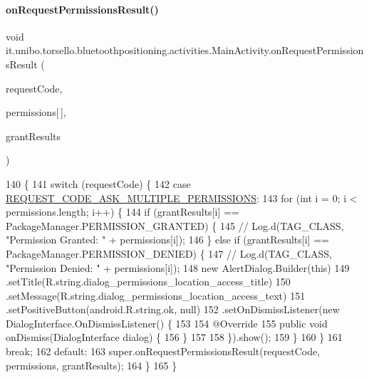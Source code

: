 \paragraph{\texorpdfstring{on\+Request\+Permissions\+Result()}{onRequestPermissionsResult()}}
{\footnotesize\ttfamily void it.\+unibo.\+torsello.\+bluetoothpositioning.\+activities.\+Main\+Activity.\+on\+Request\+Permissions\+Result (\begin{DoxyParamCaption}\item[{int}]{request\+Code,  }\item[{@Non\+Null String}]{permissions\mbox{[}$\,$\mbox{]},  }\item[{@Non\+Null int \mbox{[}$\,$\mbox{]}}]{grant\+Results }\end{DoxyParamCaption})}


\begin{DoxyCode}
140                                                                         \{
141         \textcolor{keywordflow}{switch} (requestCode) \{
142             \textcolor{keywordflow}{case} \hyperlink{classit_1_1unibo_1_1torsello_1_1bluetoothpositioning_1_1activities_1_1MainActivity_a319aed5cdd5724e043302babe5fcfeac_a319aed5cdd5724e043302babe5fcfeac}{REQUEST\_CODE\_ASK\_MULTIPLE\_PERMISSIONS}:
143                 \textcolor{keywordflow}{for} (\textcolor{keywordtype}{int} i = 0; i < permissions.length; i++) \{
144                     \textcolor{keywordflow}{if} (grantResults[i] == PackageManager.PERMISSION\_GRANTED) \{
145 \textcolor{comment}{//                        Log.d(TAG\_CLASS, "Permission Granted: " + permissions[i]);}
146                     \} \textcolor{keywordflow}{else} \textcolor{keywordflow}{if} (grantResults[i] == PackageManager.PERMISSION\_DENIED) \{
147 \textcolor{comment}{//                        Log.d(TAG\_CLASS, "Permission Denied: " + permissions[i]);}
148                         \textcolor{keyword}{new} AlertDialog.Builder(\textcolor{keyword}{this})
149                                 .setTitle(R.string.dialog\_permissions\_location\_access\_title)
150                                 .setMessage(R.string.dialog\_permissions\_location\_access\_text)
151                                 .setPositiveButton(android.R.string.ok, null)
152                                 .setOnDismissListener(\textcolor{keyword}{new} DialogInterface.OnDismissListener() \{
153 
154                                     @Override
155                                     \textcolor{keyword}{public} \textcolor{keywordtype}{void} onDismiss(DialogInterface dialog) \{
156                                     \}
157 
158                                 \}).show();
159                     \}
160                 \}
161                 \textcolor{keywordflow}{break};
162             \textcolor{keywordflow}{default}:
163                 super.onRequestPermissionsResult(requestCode, permissions, grantResults);
164         \}
165     \}
\end{DoxyCode}

